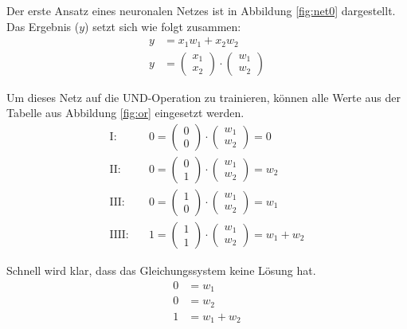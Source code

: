 \begin{flushleft}   
Der erste Ansatz eines neuronalen Netzes ist in Abbildung \ref{fig:net0} dargestellt.
Das Ergebnis ($y$) setzt sich wie folgt zusammen:
\begin{align}
    y&=x_1w_1+x_2w_2 \\
    y&=\begin{pmatrix} x_1 \\ x_2 \end{pmatrix}\cdot\begin{pmatrix} w_1 \\ w_2 \end{pmatrix}
\end{align}

Um dieses Netz auf die UND-Operation zu trainieren, können alle Werte aus der Tabelle aus Abbildung \ref{fig:or} eingesetzt werden.
\begin{align}
    \text{I:}&\quad 0=\begin{pmatrix}
        0 \\
        0
    \end{pmatrix}\cdot
    \begin{pmatrix}
        w_1 \\
        w_2
    \end{pmatrix}=0 \\
    \text{II:}&\quad 0=\begin{pmatrix}
        0 \\
        1
    \end{pmatrix}\cdot
    \begin{pmatrix}
        w_1 \\
        w_2
    \end{pmatrix}=w_2 \\
    \text{III:}&\quad 0=\begin{pmatrix}
        1 \\
        0
    \end{pmatrix}\cdot
    \begin{pmatrix}
        w_1 \\
        w_2
    \end{pmatrix}=w_1 \\
    \text{IIII:}&\quad 1=\begin{pmatrix}
        1 \\
        1
    \end{pmatrix}\cdot
    \begin{pmatrix}
        w_1 \\
        w_2
    \end{pmatrix}=w_1+w_2
\end{align}

Schnell wird klar, dass das Gleichungssystem keine Lösung hat.
\begin{align}
    0&=w_1 \\
    0&=w_2 \\
    1&=w_1+w_2
\end{align}
\end{flushleft}

